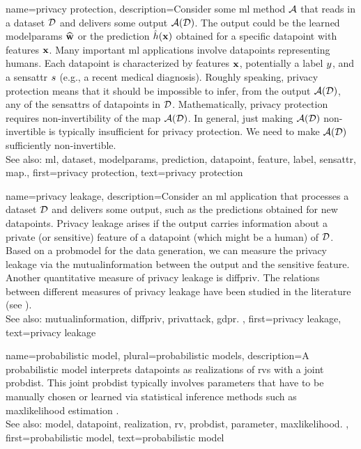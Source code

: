 {name={privacy protection},
     description={Consider some \gls{ml} method $\mathcal{A}$ that reads 
	 	in a \gls{dataset} $\mathcal{D}$ and delivers some output $\mathcal{A}(\mathcal{D})$. The output 
	 	could be the learned \gls{modelparams} $\widehat{{\bf w}}$ or the \gls{prediction} 
	 	$\hat{h}({\bf x})$ obtained for a specific \gls{datapoint} with \glspl{feature} 
	 	${\bf x}$. Many important \gls{ml} applications involve \glspl{datapoint} 
		representing humans. Each \gls{datapoint} is characterized by \glspl{feature} ${\bf x}$, 
		potentially a \gls{label} $y$, and a \gls{sensattr} $s$ (e.g., a recent medical diagnosis). 
		Roughly speaking, privacy protection means that it should be impossible to infer, from the output $\mathcal{A}(\mathcal{D})$, 
		any of the \glspl{sensattr} of \glspl{datapoint} in $\mathcal{D}$. Mathematically, privacy protection requires non-invertibility 
		of the \gls{map} $\mathcal{A}(\mathcal{D})$. In general, just making $\mathcal{A}(\mathcal{D})$ non-invertible 
		is typically insufficient for privacy protection. We need to make $\mathcal{A}(\mathcal{D})$ sufficiently non-invertible. 
					\\ 
		See also: \gls{ml}, \gls{dataset}, \gls{modelparams}, \gls{prediction}, \gls{datapoint}, \gls{feature}, \gls{label}, \gls{sensattr}, \gls{map}.}, 
	first={privacy protection}, 
	text={privacy protection} 
}

{name={privacy leakage},
	description={Consider an \gls{ml} application that processes a 
		\gls{dataset} $\mathcal{D}$ and delivers some output, such as the \glspl{prediction} 
		obtained for new \glspl{datapoint}. Privacy leakage arises 
		if the output carries information about a private (or sensitive) \gls{feature} of 
		a \gls{datapoint} (which might be a human) of $\mathcal{D}$. Based on a \gls{probmodel} 
		for the \gls{data} generation, we can measure the privacy leakage via the \gls{mutualinformation} 
		between the output and the sensitive \gls{feature}. Another quantitative measure of privacy leakage 
		is \gls{diffpriv}. The relations between different measures of privacy leakage have been 
		studied in the literature (see \cite{InfThDiffPriv}). 
				\\ 
		See also: \gls{mutualinformation}, \gls{diffpriv}, \gls{privattack}, \gls{gdpr}. }, 
	first={privacy leakage}, 
	text={privacy leakage} 
}


{name={probabilistic model}, plural={probabilistic models},
	description={A probabilistic \gls{model} interprets \glspl{datapoint} 
		as \glspl{realization} of \glspl{rv} with a joint \gls{probdist}. This joint \gls{probdist} typically 
		involves \glspl{parameter} that have to be manually chosen or learned via statistical inference 
		methods such as \gls{maxlikelihood} estimation \cite{LC}.
					\\ 
		See also: \gls{model}, \gls{datapoint}, \gls{realization}, \gls{rv}, \gls{probdist}, \gls{parameter}, \gls{maxlikelihood}. }, 
	first={probabilistic model}, 
	text={probabilistic model} 
}



